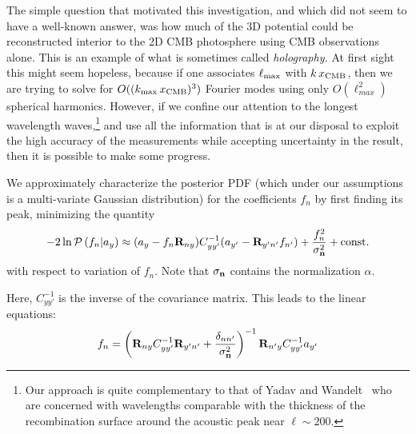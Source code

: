 \documentclass[psfig,11pt]{article}
\def\ni{\noindent}
\begin{document}
{\ni{\bf Preliminary Results:}
The simple question that motivated this investigation, and which did not seem to have a well-known answer, was how much of the 3D potential could be reconstructed interior to the 2D CMB photosphere using CMB observations alone. This is an example of what is sometimes called {\it holography.} At first sight this might seem hopeless, because if one associates $\ell_{\rm max}$ with $k\,x_{\rm CMB}$, then we are trying to solve for $O((k_{\rm max}\,x_{\rm CMB})^3)$ Fourier modes using only $O(\ell_{max}^2)$ spherical harmonics. However, if we confine our attention to the longest wavelength waves,\footnote{Our approach is quite complementary to that of Yadav and Wandelt~\cite{Yadav:2005} who are concerned with wavelengths comparable with the thickness of the recombination surface around the acoustic peak near $\ell\sim200$.} and use all the information that is at our disposal to exploit the high accuracy of the measurements while accepting uncertainty in the result, then it is possible to make some progress.

We approximately characterize the posterior PDF (which under our assumptions is a multi-variate Gaussian distribution) for the coefficients $f_n$ by first finding its peak, minimizing the quantity
\begin{equation}
-2\ln{\cal P}\left(f_n|a_y\right) \approx (a_y- f_n\mathbf{R}_{ny})C_{yy'}^{-1}(a_{y'}-\mathbf{R}_{y'n'}f_{n'})+\frac{f_n^2}{\sigma_{{\bf n}}^2} + \mathrm{const.}
\end{equation}
with respect to variation of $f_n$. Note that $\sigma_{\bf n}$ contains the normalization $\alpha$.

Here, $C_{yy'}^{-1}$ is the inverse
of the covariance matrix. This leads to the linear equations:
\begin{equation}
f_n=\left(\mathbf{R}_{ny}C_{yy'}^{-1}\mathbf{R}_{y'n'}+\frac{\delta_{nn'}}{\sigma_{\bf n}^2}\right)^{-1}\mathbf{R}_{n'y}C_{yy'}^{-1}a_{y'}
\end{equation}

}
\end{document}
